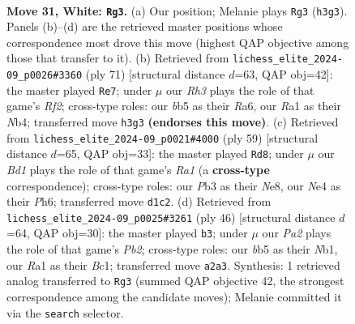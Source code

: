 \documentclass[11pt]{article}
\begin{document}
\clearpage

\begin{figure}[p]\centering
\begin{subfigure}{0.46\textwidth}\centering
\resizebox{\linewidth}{!}{%
\newchessgame
\chessboard[
  setfen={r5k1/4rppp/1n6/pb2p1P1/1n2N3/1P2P2R/P5PP/RN1B3K w - - 0 31},
  showmover=false,
  pgfstyle=straightmove, color=movearrow, markmove={h3-g3}
]}
\caption{}
\end{subfigure}\hfill
\begin{subfigure}{0.46\textwidth}\centering
\resizebox{\linewidth}{!}{%
\newchessgame
\chessboard[
  setfen={8/p4rpk/r5n1/4p2p/1nNpP3/1P3PP1/3R2KP/1RN5 b - - 7 36},
  showmover=false,
  pgfstyle=straightmove, color=movearrow, markmove={f7-e7}
]}
\caption{}
\end{subfigure}
\\[4pt]
\begin{subfigure}{0.46\textwidth}\centering
\resizebox{\linewidth}{!}{%
\newchessgame
\chessboard[
  setfen={r3nk2/p1p2r2/1p1p2pp/3P4/4N1PP/5PK1/PP2R3/2R5 b - - 6 30},
  showmover=false,
  pgfstyle=straightmove, color=movearrow, markmove={a8-d8}
]}
\caption{}
\end{subfigure}\hfill
\begin{subfigure}{0.46\textwidth}\centering
\resizebox{\linewidth}{!}{%
\newchessgame
\chessboard[
  setfen={3r4/1pp2k2/5bp1/p2r3p/P1n5/2P3PP/RP3P2/1NB1RK2 w - - 0 24},
  showmover=false,
  pgfstyle=straightmove, color=movearrow, markmove={b2-b3}
]}
\caption{}
\end{subfigure}
\caption{\textbf{Move 31, White: \texttt{Rg3}.} (a) Our position; Melanie plays \texttt{Rg3} (\texttt{h3g3}). Panels (b)--(d) are the retrieved master positions whose correspondence most drove this move (highest QAP objective among those that transfer to it). (b) Retrieved from \texttt{lichess\_elite\_2024-09\_p0026\#3360} (ply 71) [structural distance $d$=63, QAP obj=42]: the master played \texttt{Re7}; under $\mu$ our \emph{Rh3} plays the role of that game's \emph{Rf2}; cross-type roles: our \emph{b}b5 as their \emph{R}a6, our \emph{R}a1 as their \emph{N}b4; transferred move \texttt{h3g3} \textbf{(endorses this move)}. (c) Retrieved from \texttt{lichess\_elite\_2024-09\_p0021\#4000} (ply 59) [structural distance $d$=65, QAP obj=33]: the master played \texttt{Rd8}; under $\mu$ our \emph{Bd1} plays the role of that game's \emph{Ra1} (a \textbf{cross-type} correspondence); cross-type roles: our \emph{P}b3 as their \emph{N}e8, our \emph{N}e4 as their \emph{P}h6; transferred move \texttt{d1c2}. (d) Retrieved from \texttt{lichess\_elite\_2024-09\_p0025\#3261} (ply 46) [structural distance $d$=64, QAP obj=30]: the master played \texttt{b3}; under $\mu$ our \emph{Pa2} plays the role of that game's \emph{Pb2}; cross-type roles: our \emph{b}b5 as their \emph{N}b1, our \emph{R}a1 as their \emph{B}c1; transferred move \texttt{a2a3}. Synthesis: 1 retrieved analog transferred to \texttt{Rg3} (summed QAP objective 42, the strongest correspondence among the candidate moves); Melanie committed it via the \texttt{search} selector.}
\label{fig:thought-m60}
\end{figure}
\end{document}
